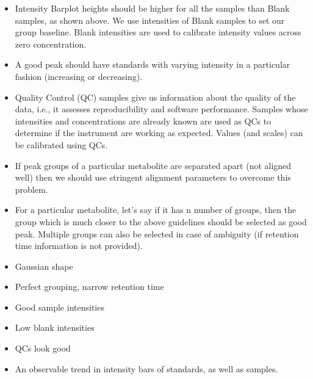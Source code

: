 \documentclass[letterpaper,10pt,english,openany,oneside]{sphinxmanual}
\begin{document}
\begin{itemize}
\item {} 
Intensity Barplot heights should be higher for all the samples than Blank samples, as shown above. We use intensities of Blank samples to set our group baseline. Blank intensities are used to calibrate intensity values across zero concentration.

\item {} 
A good peak should have standards with varying intensity in a particular fashion (increasing or decreasing).

\item {} 
Quality Control (QC) samples give us information about the quality of the data, i.e., it assesses reproducibility and software performance. Samples whose intensities and concentrations are already known are used as QCs to determine if the instrument are working as expected. Values (and scales) can be calibrated using QCs.

\item {} 
If peak groups of a particular metabolite are separated apart (not aligned well) then we should use stringent alignment parameters to overcome this problem.

\item {} 
For a particular metabolite, let’s say if it has n number of groups, then the group which is much closer to the above guidelines should be selected as good peak. Multiple groups can also be selected in case of ambiguity (if retention time information is not provided).

\end{itemize}




\begin{itemize}
\item {} 
Gaussian shape

\item {} 
Perfect grouping, narrow retention time

\item {} 
Good sample intensities

\item {} 
Low blank intensities

\item {} 
QCs look good

\item {} 
An observable trend in intensity bars of standards, as well as samples.

\end{itemize}
\end{document}
